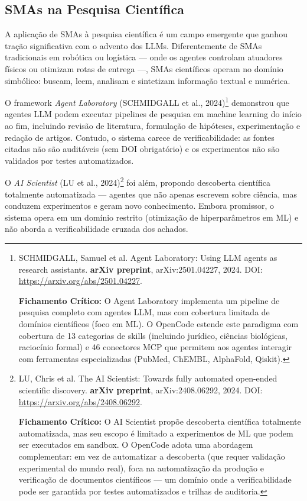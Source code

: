 \subsection{SMAs na Pesquisa Científica}

A aplicação de SMAs à pesquisa científica é um campo emergente que ganhou tração significativa com o advento dos LLMs. Diferentemente de SMAs tradicionais em robótica ou logística --- onde os agentes controlam atuadores físicos ou otimizam rotas de entrega ---, SMAs científicos operam no domínio simbólico: buscam, leem, analisam e sintetizam informação textual e numérica.

O framework \textit{Agent Laboratory} (SCHMIDGALL et al., 2024)\footnote{
  SCHMIDGALL, Samuel et al. Agent Laboratory: Using LLM agents as research assistants. \textbf{arXiv preprint}, arXiv:2501.04227, 2024. DOI: \url{https://arxiv.org/abs/2501.04227}.

  \textbf{Fichamento Crítico:} O Agent Laboratory implementa um pipeline de pesquisa completo com agentes LLM, mas com cobertura limitada de domínios científicos (foco em ML). O OpenCode estende este paradigma com cobertura de 13 categorias de skills (incluindo jurídico, ciências biológicas, raciocínio formal) e 46 conectores MCP que permitem aos agentes interagir com ferramentas especializadas (PubMed, ChEMBL, AlphaFold, Qiskit).
} demonstrou que agentes LLM podem executar pipelines de pesquisa em machine learning do início ao fim, incluindo revisão de literatura, formulação de hipóteses, experimentação e redação de artigos. Contudo, o sistema carece de verificabilidade: as fontes citadas não são auditáveis (sem DOI obrigatório) e os experimentos não são validados por testes automatizados.

O \textit{AI Scientist} (LU et al., 2024)\footnote{
  LU, Chris et al. The AI Scientist: Towards fully automated open-ended scientific discovery. \textbf{arXiv preprint}, arXiv:2408.06292, 2024. DOI: \url{https://arxiv.org/abs/2408.06292}.

  \textbf{Fichamento Crítico:} O AI Scientist propõe descoberta científica totalmente automatizada, mas seu escopo é limitado a experimentos de ML que podem ser executados em sandbox. O OpenCode adota uma abordagem complementar: em vez de automatizar a descoberta (que requer validação experimental do mundo real), foca na automatização da produção e verificação de documentos científicos --- um domínio onde a verificabilidade pode ser garantida por testes automatizados e trilhas de auditoria.
} foi além, propondo descoberta científica totalmente automatizada --- agentes que não apenas escrevem sobre ciência, mas conduzem experimentos e geram novo conhecimento. Embora promissor, o sistema opera em um domínio restrito (otimização de hiperparâmetros em ML) e não aborda a verificabilidade cruzada dos achados.

